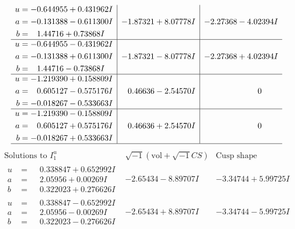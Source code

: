 \documentclass[1p]{elsarticle_modified}
\theoremstyle{definition}
\newcommand{\I}{\sqrt{-1}}
\begin{document}
$$\begin{array}{c|c|c}
\begin{aligned}
u &= -0.644955 + 0.431962 I \\
a &= -0.131388 - 0.611300 I \\
b &= \phantom{-}1.44716 + 0.73868 I\end{aligned}
 & -1.87321 + 8.07778 I & -2.27368 - 4.02394 I \\ \hline\begin{aligned}
u &= -0.644955 - 0.431962 I \\
a &= -0.131388 + 0.611300 I \\
b &= \phantom{-}1.44716 - 0.73868 I\end{aligned}
 & -1.87321 - 8.07778 I & -2.27368 + 4.02394 I \\ \hline\begin{aligned}
u &= -1.219390 + 0.158809 I \\
a &= \phantom{-}0.605127 - 0.575176 I \\
b &= -0.018267 - 0.533663 I\end{aligned}
 & \phantom{-}0.46636 - 2.54570 I & \phantom{-0.000000 } 0 \\ \hline\begin{aligned}
u &= -1.219390 - 0.158809 I \\
a &= \phantom{-}0.605127 + 0.575176 I \\
b &= -0.018267 + 0.533663 I\end{aligned}
 & \phantom{-}0.46636 + 2.54570 I & \phantom{-0.000000 } 0\\
 \hline 
 \end{array}$$\newpage$$\begin{array}{c|c|c}  
\text{Solutions to }I^u_{1}& \I (\text{vol} + \sqrt{-1}CS) & \text{Cusp shape}\\
 \hline 
\begin{aligned}
u &= \phantom{-}0.338847 + 0.652992 I \\
a &= \phantom{-}2.05956 + 0.00269 I \\
b &= \phantom{-}0.322023 + 0.276626 I\end{aligned}
 & -2.65434 - 8.89707 I & -3.34744 + 5.99725 I \\ \hline\begin{aligned}
u &= \phantom{-}0.338847 - 0.652992 I \\
a &= \phantom{-}2.05956 - 0.00269 I \\
b &= \phantom{-}0.322023 - 0.276626 I\end{aligned}
 & -2.65434 + 8.89707 I & -3.34744 - 5.99725 I \\ \hline\begin{aligned}

\end{aligned}
\end{array}$$
\end{document}
